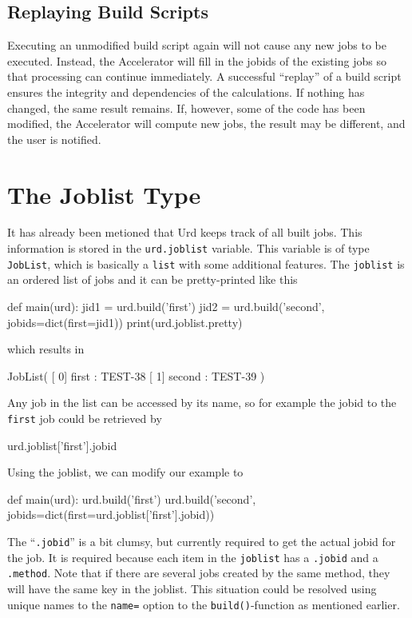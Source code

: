 \subsection{Replaying Build Scripts}
Executing an unmodified build script again will not cause any new jobs
to be executed.  Instead, the Accelerator will fill in the jobids of
the existing jobs so that processing can continue immediately.  A
successful ``replay'' of a build script ensures the integrity and
dependencies of the calculations.  If nothing has changed, the same
result remains.  If, however, some of the code has been modified, the
Accelerator will compute new jobs, the result may be different, and
the user is notified.




\section{The Joblist Type}
It has already been metioned that Urd keeps track of all built jobs.
This information is stored in the \texttt{urd.joblist} variable.  This
variable is of type \texttt{JobList}, which is basically
a \texttt{list} with some additional features.  The \texttt{joblist}
is an ordered list of jobs and it can be pretty-printed like this
\begin{python}
def main(urd):
    jid1 = urd.build('first')
    jid2 = urd.build('second', jobids=dict(first=jid1))
    print(urd.joblist.pretty)
\end{python}
which results in
\begin{shell}
JobList(
   [  0]  first : TEST-38
   [  1] second : TEST-39
)
\end{shell}
Any job in the list can be accessed by its name, so for example the
jobid to the \texttt{first} job could be retrieved by
\begin{python}
urd.joblist['first'].jobid
\end{python}
Using the joblist, we can modify our example to
\begin{python}
def main(urd):
    urd.build('first')
    urd.build('second', jobids=dict(first=urd.joblist['first'].jobid))
\end{python}
The ``\texttt{.jobid}'' is a bit clumsy, but currently required to get
the actual jobid for the job.  It is required because each item in
the \texttt{joblist} has a \texttt{.jobid} and a \texttt{.method}.
Note that if there are several jobs created by the same method, they
will have the same key in the joblist.  This situation could be
resolved using unique names to the \texttt{name=} option to
the \texttt{build()}-function as mentioned earlier.

